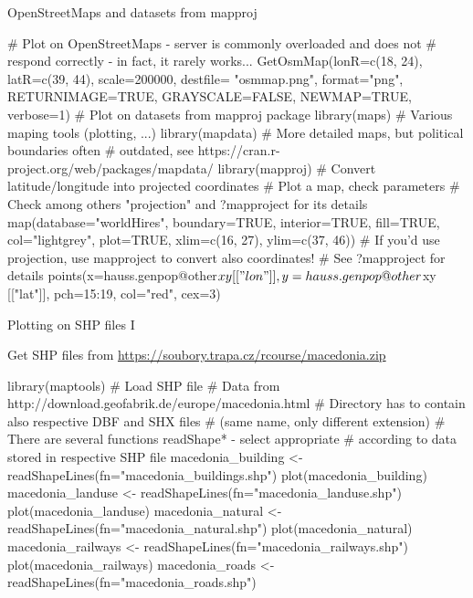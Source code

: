 \documentclass[compress, ucs, xelatex, 11pt, xcolor=svgnames,
  hyperref={
    bookmarks=true,
    unicode=true,
    colorlinks=true,
    pdftitle={Molecular data in R},
    plainpages=false,
    pdfauthor={Vojtech Zeisek},
    pdfsubject={Course about phylogeny and evolution in R},
    pdfcreator={XeLaTeX},
    pdfkeywords={R, evolution, phylogeny, molecular data},
    linkcolor=Tomato,
    anchorcolor=SaddleBrown,
    citecolor=Goldenrod,
    filecolor=DarkMagenta,
    menucolor=Sienna,
    urlcolor=DarkTurquoise,
    pdftex},
  url={hyphens, lowtilde} %
  ]{beamer}
\begin{document}
\begin{frame}[fragile]{OpenStreetMaps and datasets from mapproj}
  \begin{spluscode}
    # Plot on OpenStreetMaps - server is commonly overloaded and does not
    # respond correctly - in fact, it rarely works...
    GetOsmMap(lonR=c(18, 24), latR=c(39, 44), scale=200000, destfile=
      "osmmap.png", format="png", RETURNIMAGE=TRUE, GRAYSCALE=FALSE,
      NEWMAP=TRUE, verbose=1)
    # Plot on datasets from mapproj package
    library(maps) # Various maping tools (plotting, ...)
    library(mapdata) # More detailed maps, but political boundaries often
           # outdated, see https://cran.r-project.org/web/packages/mapdata/
    library(mapproj) # Convert latitude/longitude into projected coordinates
    # Plot a map, check parameters
    # Check among others "projection" and ?mapproject for its details
    map(database="worldHires", boundary=TRUE, interior=TRUE, fill=TRUE,
      col="lightgrey", plot=TRUE, xlim=c(16, 27), ylim=c(37, 46))
    # If you'd use projection, use mapproject to convert also coordinates!
    # See ?mapproject for details
    points(x=hauss.genpop@other$xy[["lon"]], y=hauss.genpop@other$xy
      [["lat"]], pch=15:19, col="red", cex=3)
  \end{spluscode}
\end{frame}

\begin{frame}[fragile]{Plotting on SHP files I}
  \vfil
  \begin{scriptsize}
    Get SHP files from \url{https://soubory.trapa.cz/rcourse/macedonia.zip}
  \end{scriptsize}
  \vfill
  \begin{spluscode}
    library(maptools)
    # Load SHP file
    # Data from http://download.geofabrik.de/europe/macedonia.html
    # Directory has to contain also respective DBF and SHX files
    # (same name, only different extension)
    # There are several functions readShape* - select appropriate
    # according to data stored in respective SHP file
    macedonia_building <- readShapeLines(fn="macedonia_buildings.shp")
    plot(macedonia_building)
    macedonia_landuse <- readShapeLines(fn="macedonia_landuse.shp")
    plot(macedonia_landuse)
    macedonia_natural <- readShapeLines(fn="macedonia_natural.shp")
    plot(macedonia_natural)
    macedonia_railways <- readShapeLines(fn="macedonia_railways.shp")
    plot(macedonia_railways)
    macedonia_roads <- readShapeLines(fn="macedonia_roads.shp")
  \end{spluscode}
  \vfil
\end{frame}
\end{document}
